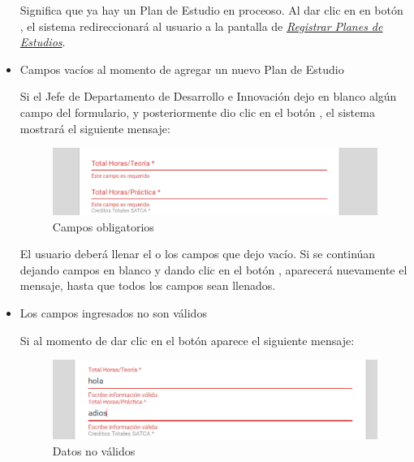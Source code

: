 \begin{itemize}
	
	Significa que ya hay un Plan de Estudio en proceoso. Al dar clic en en botón , el sistema redireccionará al usuario a la pantalla de \hyperlink{registrarPE}{\textit{Registrar Planes de Estudios}}. 
	
	\item Campos vacíos al momento de agregar un nuevo Plan de Estudio
	
	Si el Jefe de Departamento de Desarrollo e Innovación dejo en blanco algún campo del formulario, y posteriormente dio clic en el botón , el sistema mostrará el siguiente mensaje:
		\begin{figure}[!hbtp]
		\centering
		\hypertarget{ms4}{\includegraphics[width=0.7\linewidth]{images/SP4-GPE/m4}}
		\caption{Campos obligatorios}
		\label{ms4}
	    \end{figure}
    
	El usuario deberá llenar el o los campos que dejo vacío. Si se continúan dejando campos en blanco y dando clic en el botón , aparecerá nuevamente el mensaje, hasta que todos los campos sean llenados.\\
	
	\newpage
	
	\item Los campos ingresados no son válidos
	
	Si al momento de dar clic en el botón  aparece el siguiente mensaje:
	\begin{figure}[!hbtp]
		\centering
		\hypertarget{ms5}{\includegraphics[width=0.7\linewidth]{images/SP4-GPE/m5}}
		\caption{Datos no válidos}
		\label{ms5}
	\end{figure}
	
\end{itemize}
